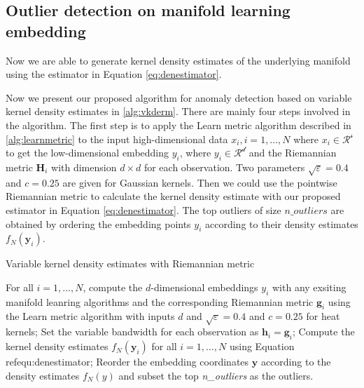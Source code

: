 \documentclass[11pt,a4paper,]{article}
\begin{document}
\hypertarget{outlier-detection-on-manifold-learning-embedding}{%
\subsection{Outlier detection on manifold learning embedding}\label{outlier-detection-on-manifold-learning-embedding}}

Now we are able to generate kernel density estimates of the underlying manifold using the estimator in Equation \eqref{eq:denestimator}.

Now we present our proposed algorithm for anomaly detection based on variable kernel density estimates in \ref{alg:vkderm}. There are mainly four steps involved in the algorithm. The first step is to apply the Learn metric algorithm described in \ref{alg:learnmetric} to the input high-dimensional data \(x_i,i=1,\ldots,N\) where \(x_i\in \mathcal{R^s}\) to get the low-dimensional embedding \(y_i\), where \(y_i\in \mathcal{R^d}\) and the Riemannian metric \(\pmb{H}_i\) with dimension \(d\times d\) for each observation. Two parameters \(\sqrt{\varepsilon} = 0.4\) and \(c=0.25\) are given for Gaussian kernels. Then we could use the pointwise Riemannian metric to calculate the kernel density estimate with our proposed estimator in Equation \eqref{eq:denestimator}. The top outliers of size \(n\_outliers\) are obtained by ordering the embedding points \(y_i\) according to their density estimates \(f_N(\pmb{y}_i)\).

\begin{algorithm}[!htb]
  \caption{Variable kernel density estimates with Riemannian metric}
  \label{alg:vkderm}
  \DontPrintSemicolon
  \SetAlgoLined
  \BlankLine
  \begin{algorithmic}[1]

  \STATE For all $i=1,\ldots,N$, compute the $d$-dimensional embeddings $y_i$ with any exsiting manifold leanring algorithms and the corresponding Riemannian metric $\pmb{g}_i$ using the Learn metric algorithm with inputs $d$ and $\sqrt{\varepsilon} = 0.4$ and $c=0.25$ for heat kernels;
  \STATE Set the variable bandwidth for each observation as $\pmb{h}_i = \pmb{g}_i$;
  \STATE Compute the kernel density estimates $f_N(\pmb{y}_i)$ for all $i=1,\ldots,N$ using Equation \\ref{equ:denestimator};
  \STATE Reorder the embedding coordinates $\pmb{y}$ according to the density estimates $f_N(y)$ and subset the top \textit{n\_outliers} as the outliers.
  \end{algorithmic}
\end{algorithm}
\end{document}
